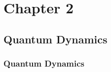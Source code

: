 \section{Chapter 2}
\subsection{Quantum Dynamics}

\begin{frame}
	\frametitle{Quantum Dynamics}



\end{frame}
